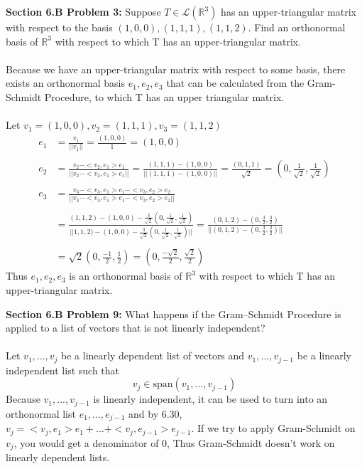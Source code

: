 \documentclass[12pt]{article}
\begin{document}
\noindent \textbf{Section 6.B Problem 3: }Suppose $T \in \mathcal{L}(\mathbb{R}^3)$ has an upper-triangular matrix with respect to
the basis $(1,0,0),(1,1,1),(1,1,2)$. Find an orthonormal basis of $\mathbb{R}^3$ with respect to which T has an upper-triangular matrix. 
\\ \\
Because we have an upper-triangular matrix with respect to some basis, there exists an orthonormal basis $e_1, e_2, e_3$ that can be calculated from the Gram-Schmidt Procedure, to which T has an upper triangular matrix. 
\\ \\
Let $v_1 = (1,0,0), v_2 = (1,1,1), v_3 = (1,1,2)$
	\begin{align*}
		e_1 &= \frac{v_1}{|| v_1 ||} = \frac{(1,0,0)}{1} = (1,0,0) \\ \\
		e_2 &= \frac{v_2 - <v_2, e_1>e_1}{|| v_2 - <v_2, e_1>e_1 ||} = \frac{(1,1,1) - (1,0,0)}{|| (1,1,1) - (1,0,0) ||} = \frac{(0,1,1)}{\sqrt{2}} = (0,\frac{1}{\sqrt{2}},\frac{1}{\sqrt{2}}) \\ \\
		e_3 &= \frac{v_3 - <v_3, e_1>e_1 - <v_3,e_2>e_2}{|| v_3 - <v_3, e_1>e_1 - <v_3,e_2>e_2 ||}\\ \\
		&= \frac{(1,1,2) - (1,0,0) - \frac{3}{\sqrt{2}}(0,\frac{1}{\sqrt{2}},\frac{1}{\sqrt{2}})}{|| 1,1,2) - (1,0,0) - \frac{3}{\sqrt{2}}(0,\frac{1}{\sqrt{2}},\frac{1}{\sqrt{2}}) ||} 
		= 
		\frac{(0,1,2) - (0,\frac{3}{2},\frac{3}{2})}{|| (0,1,2) - (0,\frac{3}{2},\frac{3}{2}) ||} \\ \\
		&= \sqrt{2}(0,\frac{-1}{2},\frac{1}{2}) = (0, \frac{-\sqrt{2}}{2}, \frac{\sqrt{2}}{2})
	\end{align*}
Thus $e_1, e_2, e_3$ is an orthonormal basis of $\mathbb{R}^3$ with respect to which T has an upper-triangular matrix.

\newpage 

\noindent \textbf{Section 6.B Problem 9: }What happens if the Gram–Schmidt Procedure is applied to a list of vectors that is not linearly independent?
\\ \\
Let $v_1, ..., v_j$ be a linearly dependent list of vectors and $v_1, ..., v_{j-1}$ be a linearly independent list such that 
$$
v_j \in \text{span}(v_1, ..., v_{j-1})
$$
Because $v_1, ..., v_{j-1}$ is linearly independent, it can be used to turn into an orthonormal list $e_1, ..., e_{j-1}$ and by 6.30, $v_j = <v_j,e_1>e_1 + ... + <v_j,e_{j-1}>e_{j-1}$.  If we try to apply Gram-Schmidt on $v_j$, you would get a denominator of 0, Thus Gram-Schmidt doesn't work on linearly dependent lists.
\end{document}
